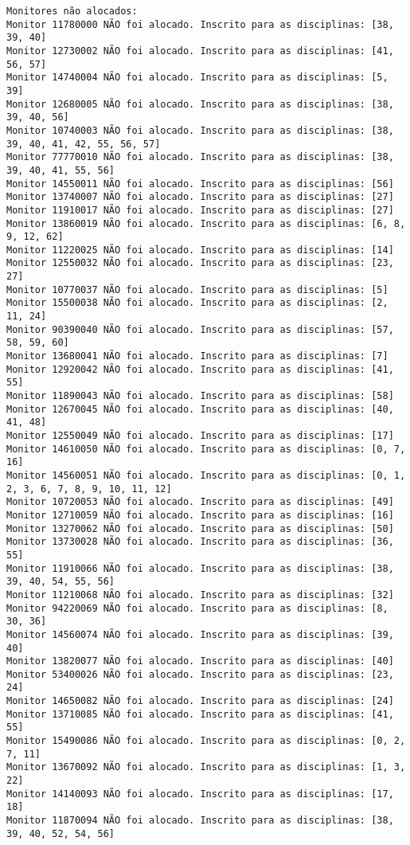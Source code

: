 \documentclass[a4paper,12pt]{article}
\begin{document}
\begin{lstlisting}[breaklines=true]
Monitores não alocados:
Monitor 11780000 NÃO foi alocado. Inscrito para as disciplinas: [38, 39, 40]
Monitor 12730002 NÃO foi alocado. Inscrito para as disciplinas: [41, 56, 57]
Monitor 14740004 NÃO foi alocado. Inscrito para as disciplinas: [5, 39]
Monitor 12680005 NÃO foi alocado. Inscrito para as disciplinas: [38, 39, 40, 56]
Monitor 10740003 NÃO foi alocado. Inscrito para as disciplinas: [38, 39, 40, 41, 42, 55, 56, 57]
Monitor 77770010 NÃO foi alocado. Inscrito para as disciplinas: [38, 39, 40, 41, 55, 56]
Monitor 14550011 NÃO foi alocado. Inscrito para as disciplinas: [56]
Monitor 13740007 NÃO foi alocado. Inscrito para as disciplinas: [27]
Monitor 11910017 NÃO foi alocado. Inscrito para as disciplinas: [27]
Monitor 13860019 NÃO foi alocado. Inscrito para as disciplinas: [6, 8, 9, 12, 62]
Monitor 11220025 NÃO foi alocado. Inscrito para as disciplinas: [14]
Monitor 12550032 NÃO foi alocado. Inscrito para as disciplinas: [23, 27]
Monitor 10770037 NÃO foi alocado. Inscrito para as disciplinas: [5]
Monitor 15500038 NÃO foi alocado. Inscrito para as disciplinas: [2, 11, 24]
Monitor 90390040 NÃO foi alocado. Inscrito para as disciplinas: [57, 58, 59, 60]
Monitor 13680041 NÃO foi alocado. Inscrito para as disciplinas: [7]
Monitor 12920042 NÃO foi alocado. Inscrito para as disciplinas: [41, 55]
Monitor 11890043 NÃO foi alocado. Inscrito para as disciplinas: [58]
Monitor 12670045 NÃO foi alocado. Inscrito para as disciplinas: [40, 41, 48]
Monitor 12550049 NÃO foi alocado. Inscrito para as disciplinas: [17]
Monitor 14610050 NÃO foi alocado. Inscrito para as disciplinas: [0, 7, 16]
Monitor 14560051 NÃO foi alocado. Inscrito para as disciplinas: [0, 1, 2, 3, 6, 7, 8, 9, 10, 11, 12]
Monitor 10720053 NÃO foi alocado. Inscrito para as disciplinas: [49]
Monitor 12710059 NÃO foi alocado. Inscrito para as disciplinas: [16]
Monitor 13270062 NÃO foi alocado. Inscrito para as disciplinas: [50]
Monitor 13730028 NÃO foi alocado. Inscrito para as disciplinas: [36, 55]
Monitor 11910066 NÃO foi alocado. Inscrito para as disciplinas: [38, 39, 40, 54, 55, 56]
Monitor 11210068 NÃO foi alocado. Inscrito para as disciplinas: [32]
Monitor 94220069 NÃO foi alocado. Inscrito para as disciplinas: [8, 30, 36]
Monitor 14560074 NÃO foi alocado. Inscrito para as disciplinas: [39, 40]
Monitor 13820077 NÃO foi alocado. Inscrito para as disciplinas: [40]
Monitor 53400026 NÃO foi alocado. Inscrito para as disciplinas: [23, 24]
Monitor 14650082 NÃO foi alocado. Inscrito para as disciplinas: [24]
Monitor 13710085 NÃO foi alocado. Inscrito para as disciplinas: [41, 55]
Monitor 15490086 NÃO foi alocado. Inscrito para as disciplinas: [0, 2, 7, 11]
Monitor 13670092 NÃO foi alocado. Inscrito para as disciplinas: [1, 3, 22]
Monitor 14140093 NÃO foi alocado. Inscrito para as disciplinas: [17, 18]
Monitor 11870094 NÃO foi alocado. Inscrito para as disciplinas: [38, 39, 40, 52, 54, 56]


\end{lstlisting}
\end{document}
